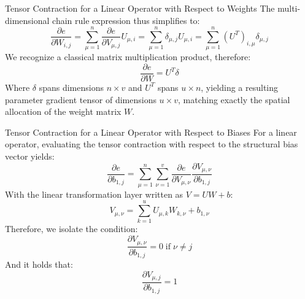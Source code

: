 \begin{frame}{Tensor Contraction for a Linear Operator with Respect to Weights}
	The multi-dimensional chain rule expression thus simplifies to:
	\begin{equation*}
		\frac{\partial{e}}{\partial{W_{i,j}}} = \sum_{\mu=1}^n \frac{\partial{e}}{\partial{V_{\mu,j}}} U_{\mu,i} = \sum_{\mu=1}^n \delta_{\mu,j} U_{\mu,i} = \sum_{\mu=1}^n \left(U^T\right)_{i,\mu} \delta_{\mu,j}
	\end{equation*}
	\pause
	We recognize a classical matrix multiplication product, therefore:
	\begin{equation*}
		\frac{\partial{e}}{\partial{W}} = U^T \delta
	\end{equation*}
	Where $\delta$ spans dimensions $n \times v$ and $U^T$ spans $u \times n$, yielding a resulting parameter gradient tensor of dimensions $u \times v$, matching exactly the spatial allocation of the weight matrix $W$. 
\end{frame}

\begin{frame}{Tensor Contraction for a Linear Operator with Respect to Biases}
	For a linear operator, evaluating the tensor contraction with respect to the structural bias vector yields:
	\begin{equation*}
		\frac{\partial{e}}{\partial{b_{1,j}}} = \sum_{\mu=1}^n \sum_{\nu=1}^v \frac{\partial{e}}{\partial{V_{\mu,\nu}}} \frac{\partial{V_{\mu,\nu}}}{\partial{b_{1,j}}}
	\end{equation*}
	\pause
	With the linear transformation layer written as $V = U W + b$:
	\begin{equation*}
		V_{\mu,\nu} = \sum_{k=1}^u U_{\mu, k} W_{k, \nu} + b_{1,\nu}
	\end{equation*}
	\pause
	Therefore, we isolate the condition:
	\begin{equation*}
		\frac{\partial{V_{\mu,\nu}}}{\partial{b_{1,j}}} = 0 \; \text{if} \; \nu \ne j
	\end{equation*}
	\pause
	And it holds that:
	\begin{equation*}
		\frac{\partial{V_{\mu,j}}}{\partial{b_{1,j}}} = 1
	\end{equation*}
\end{frame}

